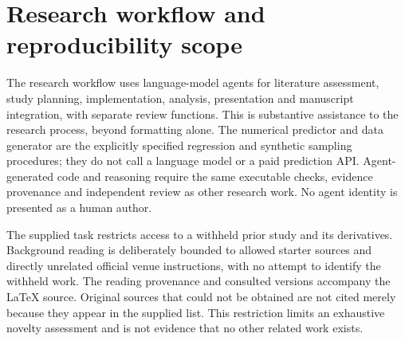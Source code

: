 \section{Research workflow and reproducibility scope}
\label{app:workflow}
The research workflow uses language-model agents for literature assessment, study planning, implementation, analysis, presentation and manuscript integration, with separate review functions. This is substantive assistance to the research process, beyond formatting alone. The numerical predictor and data generator are the explicitly specified regression and synthetic sampling procedures; they do not call a language model or a paid prediction API. Agent-generated code and reasoning require the same executable checks, evidence provenance and independent review as other research work. No agent identity is presented as a human author.

The supplied task restricts access to a withheld prior study and its derivatives. Background reading is deliberately bounded to allowed starter sources and directly unrelated official venue instructions, with no attempt to identify the withheld work. The reading provenance and consulted versions accompany the LaTeX source. Original sources that could not be obtained are not cited merely because they appear in the supplied list. This restriction limits an exhaustive novelty assessment and is not evidence that no other related work exists.
